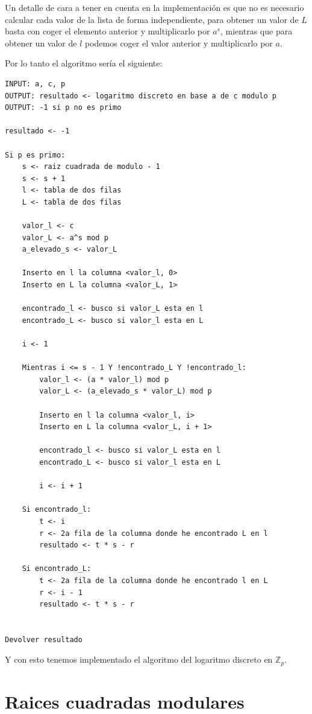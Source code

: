 \documentclass[12pt, spanish]{article}
\begin{document}
Un detalle de cara a tener en cuenta en la implementación es que no es necesario calcular cada valor de la lista de forma independiente, para obtener un valor de $L$ basta con coger el elemento anterior y multiplicarlo por $a^s$, mientras que para obtener un valor de $l$ podemos coger el valor anterior y multiplicarlo por $a$.

Por lo tanto el algoritmo sería el siguiente:

\begin{lstlisting}[caption={Algoritmo paso enano paso gigante}]
INPUT: a, c, p
OUTPUT: resultado <- logaritmo discreto en base a de c modulo p
OUTPUT: -1 si p no es primo

resultado <- -1

Si p es primo:
	s <- raiz cuadrada de modulo - 1
	s <- s + 1
	l <- tabla de dos filas
	L <- tabla de dos filas

	valor_l <- c
	valor_L <- a^s mod p
	a_elevado_s <- valor_L

	Inserto en l la columna <valor_l, 0>
	Inserto en L la columna <valor_L, 1>

	encontrado_l <- busco si valor_L esta en l
	encontrado_L <- busco si valor_l esta en L

	i <- 1

	Mientras i <= s - 1 Y !encontrado_L Y !encontrado_l:
		valor_l <- (a * valor_l) mod p
		valor_L <- (a_elevado_s * valor_L) mod p

		Inserto en l la columna <valor_l, i>
		Inserto en L la columna <valor_L, i + 1>

		encontrado_l <- busco si valor_L esta en l
		encontrado_L <- busco si valor_l esta en L

		i <- i + 1

	Si encontrado_l:
		t <- i
		r <- 2a fila de la columna donde he encontrado L en l
		resultado <- t * s - r

	Si encontrado_L:
		t <- 2a fila de la columna donde he encontrado l en L
		r <- i - 1
		resultado <- t * s - r


Devolver resultado
\end{lstlisting}

Y con esto tenemos implementado el algoritmo del logaritmo discreto en $\mathbb{Z}_p$.



\section{Raices cuadradas modulares}
\end{document}

